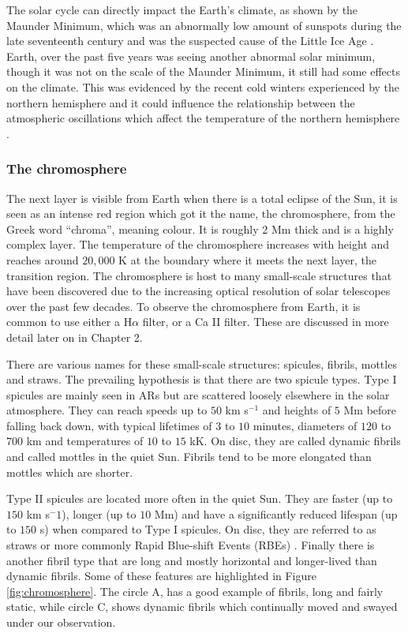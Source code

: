     The solar cycle can directly impact the Earth's climate, as shown by the Maunder Minimum, which was an abnormally low amount of sunspots during the late seventeenth century and was the suspected cause of the Little Ice Age \citep{climate}.
    Earth, over the past five years was seeing another abnormal solar minimum, though it was not on the scale of the Maunder Minimum, it still had some effects on the climate.
    This was evidenced by the recent cold winters experienced by the northern hemisphere and it could influence the relationship between the atmospheric oscillations which affect the temperature of the northern hemisphere \citep{CWE,NAO,SCR}. 
   
\subsubsection{The chromosphere}

    The next layer is visible from Earth when there is a total eclipse of the Sun, it is seen as an intense red region which got it the name, the chromosphere, from the Greek word ``chroma'', meaning colour.
    It is roughly $2$ Mm thick and is a highly complex layer.
    The temperature of the chromosphere increases with height and reaches around $20,000$ K at the boundary where it meets the next layer, the transition region.    
    The chromosphere is host to many small-scale structures that have been discovered due to the increasing optical resolution of solar telescopes over the past few decades.
    To observe the chromosphere from Earth, it is common to use either a H$\alpha$ filter, or a Ca II filter. 
    These are discussed in more detail later on in Chapter 2. 
        
    There are various names for these small-scale structures: spicules, fibrils, mottles and straws.
    The prevailing hypothesis is that there are two spicule types.
    Type I spicules are mainly seen in ARs but are scattered loosely elsewhere in the solar atmosphere.
    They can reach speeds up to $50$ km s$^{-1}$ and heights of $5$ Mm before falling back down, with typical lifetimes of $3$ to $10$ minutes, diameters of $120$ to $700$ km and temperatures of $10$ to $15$ kK.
    On disc, they are called dynamic fibrils and called mottles in the quiet Sun.
    Fibrils tend to be more elongated than mottles which are shorter.
    
    Type II spicules are located more often in the quiet Sun.
    They are faster (up to $150$ km s$^-1$), longer (up to $10$ Mm) and have a significantly reduced lifespan (up to $150$ s) when compared to Type I spicules.
    On disc, they are referred to as straws or more commonly Rapid Blue-shift Events (RBEs) \citep{Zaqarashvili2009}.
    Finally there is another fibril type that are long and mostly horizontal and longer-lived than dynamic fibrils.
    Some of these features are highlighted in Figure \ref{fig:chromosphere}.
    The circle A, has a good example of fibrils, long and fairly static, while circle C, shows dynamic fibrils which continually moved and swayed under our observation.
    
